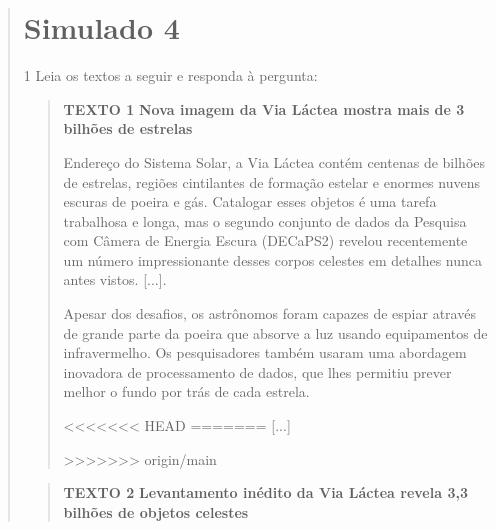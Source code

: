 \begin{quote}

\chapter{Simulado 4}

\num{1} Leia os textos a seguir e responda à pergunta:

\begin{quote}
\textbf{TEXTO 1}
\textbf{Nova imagem da Via Láctea mostra mais de 3 bilhões de
estrelas}

Endereço do Sistema Solar, a Via Láctea contém centenas de bilhões de
estrelas, regiões cintilantes de formação estelar e enormes nuvens
escuras de poeira e gás. Catalogar esses objetos é uma tarefa trabalhosa
e longa, mas o segundo conjunto de dados da Pesquisa com Câmera de
Energia Escura (DECaPS2) revelou recentemente um número impressionante
desses corpos celestes em detalhes nunca antes vistos. {[}...{]}.

Apesar dos desafios, os astrônomos foram capazes de espiar através de
grande parte da poeira que absorve a luz usando equipamentos de
infravermelho. Os pesquisadores também usaram uma abordagem inovadora de
processamento de dados, que lhes permitiu prever melhor o fundo por trás
de cada estrela.

<<<<<<< HEAD
=======
{[}...{]}

>>>>>>> origin/main
\end{quote}

\begin{quote}
\textbf{TEXTO 2}
\textbf{Levantamento inédito da Via Láctea revela 3,3 bilhões
de objetos celestes}


\end{quote}
\end{quote}

